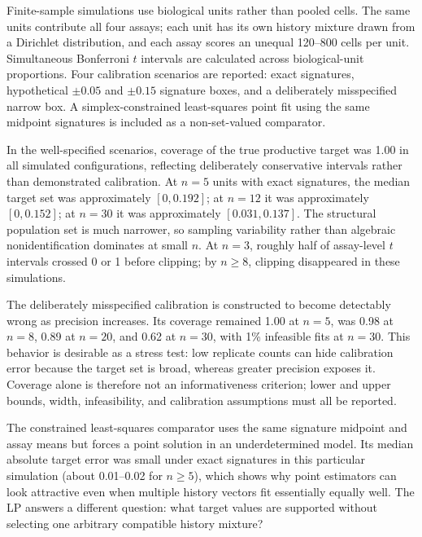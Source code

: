 \documentclass[11pt]{article}
\begin{document}
Finite-sample simulations use biological units rather than pooled cells. The same units contribute all four assays; each unit has its own history mixture drawn from a Dirichlet distribution, and each assay scores an unequal 120--800 cells per unit. Simultaneous Bonferroni $t$ intervals are calculated across biological-unit proportions. Four calibration scenarios are reported: exact signatures, hypothetical $\pm0.05$ and $\pm0.15$ signature boxes, and a deliberately misspecified narrow box. A simplex-constrained least-squares point fit using the same midpoint signatures is included as a non-set-valued comparator.

In the well-specified scenarios, coverage of the true productive target was 1.00 in all simulated configurations, reflecting deliberately conservative intervals rather than demonstrated calibration. At $n=5$ units with exact signatures, the median target set was approximately $[0,0.192]$; at $n=12$ it was approximately $[0,0.152]$; at $n=30$ it was approximately $[0.031,0.137]$. The structural population set is much narrower, so sampling variability rather than algebraic nonidentification dominates at small $n$. At $n=3$, roughly half of assay-level $t$ intervals crossed 0 or 1 before clipping; by $n\ge8$, clipping disappeared in these simulations.

The deliberately misspecified calibration is constructed to become detectably wrong as precision increases. Its coverage remained 1.00 at $n=5$, was 0.98 at $n=8$, 0.89 at $n=20$, and 0.62 at $n=30$, with 1\% infeasible fits at $n=30$. This behavior is desirable as a stress test: low replicate counts can hide calibration error because the target set is broad, whereas greater precision exposes it. Coverage alone is therefore not an informativeness criterion; lower and upper bounds, width, infeasibility, and calibration assumptions must all be reported.

The constrained least-squares comparator uses the same signature midpoint and assay means but forces a point solution in an underdetermined model. Its median absolute target error was small under exact signatures in this particular simulation (about 0.01--0.02 for $n\ge5$), which shows why point estimators can look attractive even when multiple history vectors fit essentially equally well. The LP answers a different question: what target values are supported without selecting one arbitrary compatible history mixture?
\end{document}
